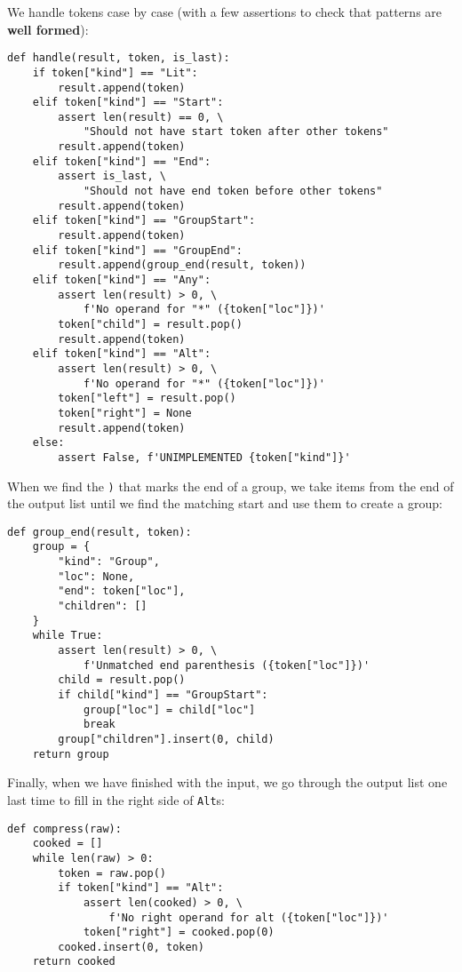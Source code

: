 \documentclass{scrbook}
\newcommand{\glossref}[1]{\textbf{#1}}
\begin{document}
We handle tokens case by case
(with a few assertions to check that patterns are \glossref{well formed}):


\begin{lstlisting}[frame=single,frameround=tttt]
def handle(result, token, is_last):
    if token["kind"] == "Lit":
        result.append(token)
    elif token["kind"] == "Start":
        assert len(result) == 0, \
            "Should not have start token after other tokens"
        result.append(token)
    elif token["kind"] == "End":
        assert is_last, \
            "Should not have end token before other tokens"
        result.append(token)
    elif token["kind"] == "GroupStart":
        result.append(token)
    elif token["kind"] == "GroupEnd":
        result.append(group_end(result, token))
    elif token["kind"] == "Any":
        assert len(result) > 0, \
            f'No operand for "*" ({token["loc"]})'
        token["child"] = result.pop()
        result.append(token)
    elif token["kind"] == "Alt":
        assert len(result) > 0, \
            f'No operand for "*" ({token["loc"]})'
        token["left"] = result.pop()
        token["right"] = None
        result.append(token)
    else:
        assert False, f'UNIMPLEMENTED {token["kind"]}'
\end{lstlisting}



When we find the \texttt{)} that marks the end of a group,
we take items from the end of the output list
until we find the matching start
and use them to create a group:


\begin{lstlisting}[frame=single,frameround=tttt]
def group_end(result, token):
    group = {
        "kind": "Group",
        "loc": None,
        "end": token["loc"],
        "children": []
    }
    while True:
        assert len(result) > 0, \
            f'Unmatched end parenthesis ({token["loc"]})'
        child = result.pop()
        if child["kind"] == "GroupStart":
            group["loc"] = child["loc"]
            break
        group["children"].insert(0, child)
    return group
\end{lstlisting}



Finally,
when we have finished with the input,
we go through the output list one last time to fill in the right side of \texttt{Alt}s:


\begin{lstlisting}[frame=single,frameround=tttt]
def compress(raw):
    cooked = []
    while len(raw) > 0:
        token = raw.pop()
        if token["kind"] == "Alt":
            assert len(cooked) > 0, \
                f'No right operand for alt ({token["loc"]})'
            token["right"] = cooked.pop(0)
        cooked.insert(0, token)
    return cooked
\end{lstlisting}
\end{document}

